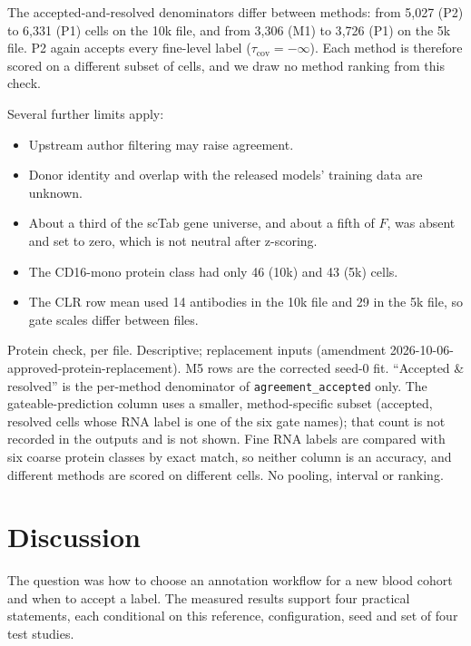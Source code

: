 \documentclass[11pt]{article}
\newcommand{\gentable}[1]{\begin{adjustbox}{max width=\textwidth,max totalheight=0.82\textheight}\end{adjustbox}}
\begin{document}
The accepted-and-resolved denominators differ between methods: from 5{,}027 (P2) to 6{,}331 (P1) cells on the 10k file, and from 3{,}306 (M1) to 3{,}726 (P1) on the 5k file. P2 again accepts every fine-level label ($\tau_\mathrm{cov}=-\infty$). Each method is therefore scored on a different subset of cells, and we draw no method ranking from this check.

Several further limits apply:
\begin{itemize}
\item Upstream author filtering may raise agreement.
\item Donor identity and overlap with the released models' training data are unknown.
\item About a third of the scTab gene universe, and about a fifth of $F$, was absent and set to zero, which is not neutral after z-scoring.
\item The CD16-mono protein class had only 46 (10k) and 43 (5k) cells.
\item The CLR row mean used 14 antibodies in the 10k file and 29 in the 5k file, so gate scales differ between files.
\end{itemize}

\begin{table}[t]
\centering
\caption{Protein check, per file. Descriptive; replacement inputs (amendment 2026-10-06-approved-protein-replacement). M5 rows are the corrected seed-0 fit. ``Accepted \& resolved'' is the per-method denominator of \nolinkurl{agreement_accepted} only. The gateable-prediction column uses a smaller, method-specific subset (accepted, resolved cells whose RNA label is one of the six gate names); that count is not recorded in the outputs and is not shown. Fine RNA labels are compared with six coarse protein classes by exact match, so neither column is an accuracy, and different methods are scored on different cells. No pooling, interval or ranking.}
\label{tab:protein}
\gentable{table_protein.tex}
\end{table}

\section{Discussion}

The question was how to choose an annotation workflow for a new blood cohort and when to accept a label. The measured results support four practical statements, each conditional on this reference, configuration, seed and set of four test studies.
\end{document}

